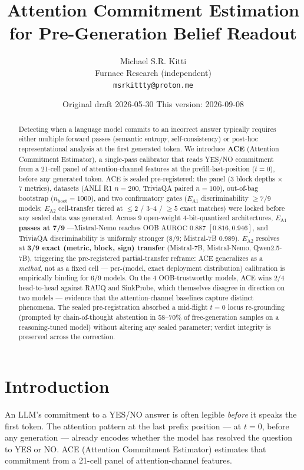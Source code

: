 \documentclass[10pt, letterpaper]{article}
\title{Attention Commitment Estimation for Pre-Generation Belief Readout}
\author{Michael S.R. Kitti \\ Furnace Research (independent) \\ \texttt{msrkittty@proton.me}}
\date{Original draft 2026-05-30 \quad This version: 2026-09-08}
\newcommand{\auroc}{\text{AUROC}}
\newcommand{\ea}[1]{$E_{\text{A}#1}$}
\begin{document}
\maketitle

\begin{abstract}
Detecting when a language model commits to an incorrect answer
typically requires either multiple forward passes (semantic entropy,
self-consistency) or post-hoc representational analysis at the first
generated token. We introduce \textbf{ACE} (Attention Commitment
Estimator), a single-pass calibrator that reads YES/NO commitment from
a 21-cell panel of attention-channel features at the
prefill-last-position ($t{=}0$), before any generated token. ACE is
sealed pre-registered: the panel (3 block depths $\times$ 7 metrics),
datasets (ANLI R1 $n{=}200$, TriviaQA paired $n{=}100$), out-of-bag
bootstrap ($n_{\text{boot}}{=}1000$), and two confirmatory gates
(\ea{1} discriminability $\geq 7/9$ models; \ea{2} cell-transfer
tiered at $\leq 2$ / $3$--$4$ / $\geq 5$ exact matches) were locked
before any sealed data was generated. Across 9 open-weight
4-bit-quantized architectures, \ea{1} \textbf{passes at 7/9}
---Mistral-Nemo reaches OOB $\auroc$ 0.887 $[0.816, 0.946]$, and
TriviaQA discriminability is uniformly stronger (8/9; Mistral-7B
0.989). \ea{2} resolves at \textbf{3/9 exact (metric, block, sign)
transfer} (Mistral-7B, Mistral-Nemo, Qwen2.5-7B), triggering the
pre-registered partial-transfer reframe: ACE generalizes as a
\emph{method}, not as a fixed cell --- per-(model, exact deployment
distribution) calibration is empirically binding for 6/9 models. On
the 4 OOB-trustworthy models, ACE wins 2/4 head-to-head against RAUQ
and SinkProbe, which themselves disagree in direction on two models
--- evidence that the attention-channel baselines capture distinct
phenomena. The sealed pre-registration absorbed a mid-flight $t{=}0$
locus re-grounding (prompted by chain-of-thought abstention in
58--70\% of free-generation samples on a reasoning-tuned model)
without altering any sealed parameter; verdict integrity is preserved
across the correction.
\end{abstract}

\section{Introduction}

An LLM's commitment to a YES/NO answer is often legible \emph{before}
it speaks the first token. The attention pattern at the last prefix
position --- at $t{=}0$, before any generation --- already encodes
whether the model has resolved the question to YES or NO. ACE
(Attention Commitment Estimator) estimates that commitment from a
21-cell panel of attention-channel features.
\end{document}

